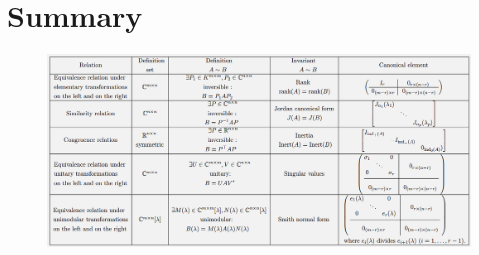 \documentclass[12pt, openany]{report}
\theoremstyle{definition}
\begin{document}
\chapter{Summary}
\begin{figure}[H]
    \centering
    \includegraphics[width=\textwidth]{img/summary.png}
\end{figure}
\end{document}
